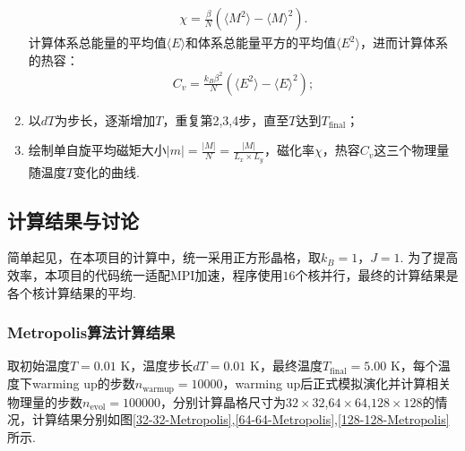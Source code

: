 \documentclass[UTF8,10pt,a4paper]{article}
\theoremstyle{Problem}
\theoremstyle{Solution}
\providecommand{\abs}[1]{\left\lvert#1\right\rvert}
\begin{document}
\begin{enumerate}
\begin{align}
        \chi=\frac{\beta}{N}(\langle M^2\rangle-\langle M\rangle^2).
    \end{align}
    计算体系总能量的平均值$\langle E\rangle$和体系总能量平方的平均值$\langle E^2\rangle$，进而计算体系的热容：
    \begin{align}
        C_v=\frac{k_B\beta^2}{N}(\langle E^2\rangle-\langle E\rangle^2);
    \end{align}
    \item 以$dT$为步长，逐渐增加$T$，重复第2,3,4步，直至$T$达到$T_{\text{final}}$；
    \item 绘制单自旋平均磁矩大小$\abs{m}=\frac{\abs{M}}{N}=\frac{\abs{M}}{L_x\times L_y}$，磁化率$\chi$，热容$C_v$这三个物理量随温度$T$变化的曲线.
\end{enumerate}

\subsection{计算结果与讨论}

简单起见，在本项目的计算中，统一采用正方形晶格，取$k_B=1$，$J=1$. 为了提高效率，本项目的代码统一适配MPI加速，程序使用$16$个核并行，最终的计算结果是各个核计算结果的平均.

\subsubsection{Metropolis算法计算结果}

取初始温度$T=0.01$ K，温度步长$dT=0.01$ K，最终温度$T_{\text{final}}=5.00$ K，每个温度下warming up的步数$n_{\text{warmup}}=10000$，warming up后正式模拟演化并计算相关物理量的步数$n_{\text{evol}}=100000$，分别计算晶格尺寸为$32\times 32$,$64\times 64$,$128\times 128$的情况，计算结果分别如图\ref{32-32-Metropolis},\ref{64-64-Metropolis},\ref{128-128-Metropolis}所示.
\end{document}
